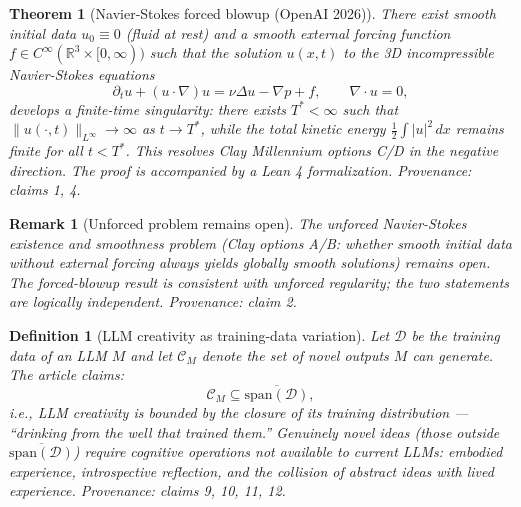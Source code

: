 \documentclass[11pt]{article}
\newtheorem{definition}{Definition}
\newtheorem{theorem}{Theorem}
\newtheorem{remark}{Remark}
\newcommand{\R}{\mathbb{R}}
\newcommand{\cC}{\mathcal{C}}
\begin{document}
\begin{theorem}[Navier-Stokes forced blowup (OpenAI 2026)]\label{thm:ns}
There exist smooth initial data $u_0 \equiv 0$ (fluid at rest) and a smooth
external forcing function $f \in C^\infty(\R^3 \times [0,\infty))$ such that
the solution $u(x,t)$ to the 3D incompressible Navier-Stokes equations
\[
  \partial_t u + (u \cdot \nabla)u = \nu \Delta u - \nabla p + f,
  \qquad \nabla \cdot u = 0,
\]
develops a finite-time singularity: there exists $T^* < \infty$ such that
$\|u(\cdot, t)\|_{L^\infty} \to \infty$ as $t \to T^*$, while the total
kinetic energy $\frac{1}{2}\int |u|^2 \, dx$ remains finite for all
$t < T^*$.  This resolves Clay Millennium options C/D in the negative
direction.  The proof is accompanied by a Lean 4 formalization.
\emph{Provenance: claims 1, 4.}
\end{theorem}

\begin{remark}[Unforced problem remains open]\label{rem:unforced}
The unforced Navier-Stokes existence and smoothness problem (Clay options
A/B: whether smooth initial data without external forcing always yields
globally smooth solutions) remains open.  The forced-blowup result is
consistent with unforced regularity; the two statements are logically
independent.
\emph{Provenance: claim 2.}
\end{remark}

\begin{definition}[LLM creativity as training-data variation]\label{def:llmcreativity}
Let $\mathcal{D}$ be the training data of an LLM $M$ and let
$\cC_M$ denote the set of novel outputs $M$ can generate.  The article
claims:
\[
  \cC_M \subseteq \overline{\mathrm{span}(\mathcal{D})},
\]
i.e., LLM creativity is bounded by the closure of its training distribution ---
``drinking from the well that trained them.''  Genuinely novel ideas
(those outside $\overline{\mathrm{span}(\mathcal{D})}$) require cognitive
operations not available to current LLMs: embodied experience, introspective
reflection, and the collision of abstract ideas with lived experience.
\emph{Provenance: claims 9, 10, 11, 12.}
\end{definition}
\end{document}
